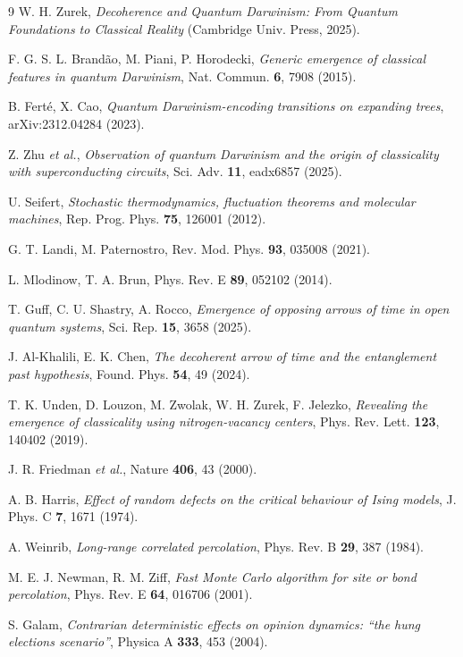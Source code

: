 \documentclass[11pt]{article}
\begin{document}
\begin{thebibliography}{9}
 W. H. Zurek, \emph{Decoherence and Quantum Darwinism:
From Quantum Foundations to Classical Reality} (Cambridge Univ. Press,
2025).

 F. G. S. L. Brand\~ao, M. Piani, P. Horodecki,
\emph{Generic emergence of classical features in quantum Darwinism}, Nat.
Commun. \textbf{6}, 7908 (2015).

 B. Fert\'e, X. Cao, \emph{Quantum Darwinism-encoding
transitions on expanding trees}, arXiv:2312.04284 (2023).

 Z. Zhu \emph{et al.}, \emph{Observation of quantum
Darwinism and the origin of classicality with superconducting circuits},
Sci. Adv. \textbf{11}, eadx6857 (2025).

 U. Seifert, \emph{Stochastic thermodynamics,
fluctuation theorems and molecular machines}, Rep. Prog. Phys.
\textbf{75}, 126001 (2012).

 G. T. Landi, M. Paternostro, Rev. Mod. Phys. \textbf{93},
035008 (2021).

 L. Mlodinow, T. A. Brun, Phys. Rev. E \textbf{89},
052102 (2014).

 T. Guff, C. U. Shastry, A. Rocco, \emph{Emergence of
opposing arrows of time in open quantum systems}, Sci. Rep. \textbf{15},
3658 (2025).

 J. Al-Khalili, E. K. Chen, \emph{The decoherent arrow
of time and the entanglement past hypothesis}, Found. Phys. \textbf{54},
49 (2024).

 T. K. Unden, D. Louzon, M. Zwolak, W. H. Zurek,
F. Jelezko, \emph{Revealing the emergence of classicality using
nitrogen-vacancy centers}, Phys. Rev. Lett. \textbf{123}, 140402 (2019).

 J. R. Friedman \emph{et al.}, Nature \textbf{406}, 43
(2000).

 A. B. Harris, \emph{Effect of random defects on the
critical behaviour of Ising models}, J. Phys. C \textbf{7}, 1671 (1974).

 A. Weinrib, \emph{Long-range correlated
percolation}, Phys. Rev. B \textbf{29}, 387 (1984).

 M. E. J. Newman, R. M. Ziff, \emph{Fast Monte
Carlo algorithm for site or bond percolation}, Phys. Rev. E \textbf{64},
016706 (2001).

 S. Galam, \emph{Contrarian deterministic effects on
opinion dynamics: ``the hung elections scenario''}, Physica A \textbf{333},
453 (2004).


\end{thebibliography}
\end{document}

